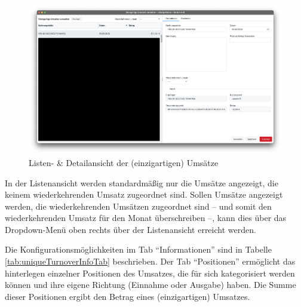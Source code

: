 \begin{figure}[ht!]
	\centering
	\includegraphics[width=\textwidth]{img/Screenshot-UniqueExpenses-MDV}
	\vspace{-2em}
	\caption{Listen- \& Detailansicht der (einzigartigen) Umsätze}
	\label{fig:mdvFixedExpenses}
\end{figure}

In der Listenansicht werden standardmäßig nur die Umsätze angezeigt, die keinem wiederkehrenden Umsatz zugeordnet sind. Sollen Umsätze angezeigt werden, die wiederkehrenden Umsätzen zugeordnet sind -- und somit den wiederkehrenden Umsatz für den Monat überschreiben --, kann dies über das Dropdown-Menü oben rechts über der Listenansicht erreicht werden.

Die Konfigurationsmöglichkeiten im Tab "`Informationen"' sind in Tabelle \ref{tab:uniqueTurnoverInfoTab} beschrieben. Der Tab "`Positionen"' ermöglicht das hinterlegen einzelner Positionen des Umsatzes, die für sich kategorisiert werden können und ihre eigene Richtung (Einnahme oder Ausgabe) haben. Die Summe dieser Positionen ergibt den Betrag eines (einzigartigen) Umsatzes.

